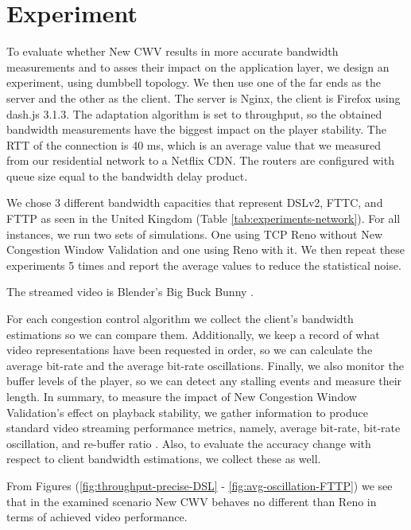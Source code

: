 \documentclass[10pt,sigconf]{acmart}
\begin{document}
\hspace{3in}

\section{Experiment}

To evaluate whether New CWV results in more accurate bandwidth measurements and to asses their impact on the application layer, we design an experiment, using dumbbell topology. We then use one of the far ends as the server and the other as the client. The server is Nginx, the client is Firefox using dash.js 3.1.3. The adaptation algorithm is set to throughput, so the obtained bandwidth measurements have the biggest impact on the player stability. The RTT of the connection is 40 ms, which is an average value that we measured from our residential network to a Netflix CDN. The routers are configured with queue size equal to the bandwidth delay product.

We chose 3 different bandwidth capacities that represent DSLv2, FTTC, and FTTP as seen in the United Kingdom \cite{online-ofcom-report} (Table \ref{tab:experiments-network}). For all instances, we run two sets of simulations. One using TCP Reno without New Congestion Window Validation and one using Reno with it. We then repeat these experiments 5 times and report the average values to reduce the statistical noise.

The streamed video is Blender's Big Buck Bunny \cite{online-bbb}.

For each congestion control algorithm we collect the client's bandwidth estimations so we can compare them. Additionally, we keep a record of what video representations have been requested in order, so we can calculate the average bit-rate and the average bit-rate oscillations. Finally, we also monitor the buffer levels of the player, so we can detect any stalling events and measure their length. In summary, to measure the impact of New Congestion Window Validation's effect on playback stability, we gather information to produce standard video streaming performance metrics, namely, average bit-rate, bit-rate oscillation, and re-buffer ratio \cite{Spiteri-2019-from-theory-to-practice-sabre, Yin-2015-a-control-theoritic-approach, Dobrian-2013-understanding-the-impact-of-video-quality}. Also, to evaluate the accuracy change with respect to client bandwidth estimations, we collect these as well.

From Figures (\ref{fig:throughput-precise-DSL} - \ref{fig:avg-oscillation-FTTP}) we see that in the examined scenario New CWV behaves no different than Reno in terms of achieved video performance.
\end{document}
